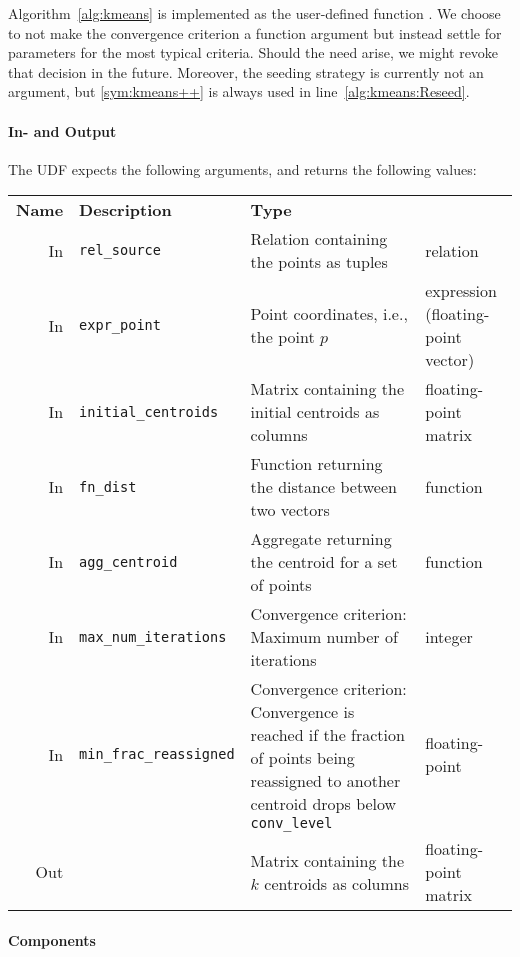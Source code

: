 Algorithm~\ref{alg:kmeans} is implemented as the user-defined function . We choose to not make the convergence criterion a function argument but instead settle for parameters for the most typical criteria. Should the need arise, we might revoke that decision in the future. Moreover, the seeding strategy is currently not an argument, but \ref{sym:kmeans++} is always used in line~\ref{alg:kmeans:Reseed}.

\paragraph{In- and Output} The UDF expects the following arguments, and returns the following values:

\begin{center}
	\begin{tabularx}{\linewidth}{rlXl}
		\toprule%
		\textbf{Name} & \textbf{Description} & \textbf{Type}
		\\\otoprule
		In &
		\texttt{rel\_source} &
		Relation containing the points as tuples &
		relation
		\\\midrule
		In &
		\texttt{expr\_point} &
		Point coordinates, i.e., the point $p$ &
		\specialcell{l}{expression\\ (floating-point vector)}
		\\\midrule
		In &
		\texttt{initial\_centroids} &
		Matrix containing the initial centroids as columns &
		floating-point matrix
		\\\midrule
		In &
		\texttt{fn\_dist} &
		Function returning the distance between two vectors &
		function
		\\\midrule
		In &
		\texttt{agg\_centroid} &
		Aggregate returning the centroid for a set of points &
		function
		\\\midrule
		In &
		\texttt{max\_num\_iterations} &
		Convergence criterion: Maximum number of iterations &
		integer
		\\\midrule
		In &
		\texttt{min\_frac\_reassigned} &
		Convergence criterion: Convergence is reached if the fraction of points being reassigned to another centroid drops below \texttt{conv\_level} &
		floating-point
		\\\midrule
		Out & &
		Matrix containing the $k$ centroids as columns &
		floating-point matrix
		\\\bottomrule
	\end{tabularx}
\end{center}

\paragraph{Components}

